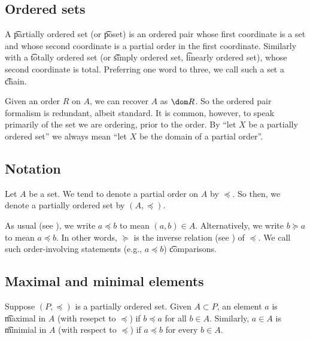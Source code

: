 
\subsection*{Ordered sets}

A \t{partially ordered set} (or \t{poset}) is an ordered pair whose first coordinate is a set and whose second coordinate is a partial order in the first coordinate.
Similarly with a \t{totally ordered set} (or \t{simply ordered set}, \t{linearly ordered set}), whose second coordinate is total.
Preferring one word to three, we call such a set a \t{chain}.

Given an order $R$ on $A$, we can recover $A$ as $\dom R$.
So the ordered pair formalism is redundant, albeit standard.
It is common, however, to speak primarily of the set we are ordering, prior to the order.
By ``let $X$ be a partially ordered set'' we always mean ``let $X$ be the domain of a partial order''.

\subsection*{Notation}

Let $A$ be a set.
We tend to denote a partial order on $A$ by $\preceq$.
So then, we denote a partially ordered set by $(A, \preceq)$.

As usual (see ), we write $a \preceq b$ to mean $(a, b) \in A$.
Alternatively, we write $b \succeq a$ to mean $a \preceq b$.
In other words, $\succeq$ is the inverse relation (see ) of $\preceq$.
We call such order-involving statements (e.g., $a \preceq b$) \t{comparisons}.

\subsection*{Maximal and minimal elements}

Suppose $(P, \preceq)$ is a partially ordered set.
Given $A \subset P$, an element $a$ is \t{maximal} in $A$ (with resepct to $\preceq$) if $b \preceq a$ for all $b \in A$.
Similarly, $a \in A$ is \t{minimial} in $A$ (with respect to $\preceq$) if $a \preceq b$ for every $b \in A$.

